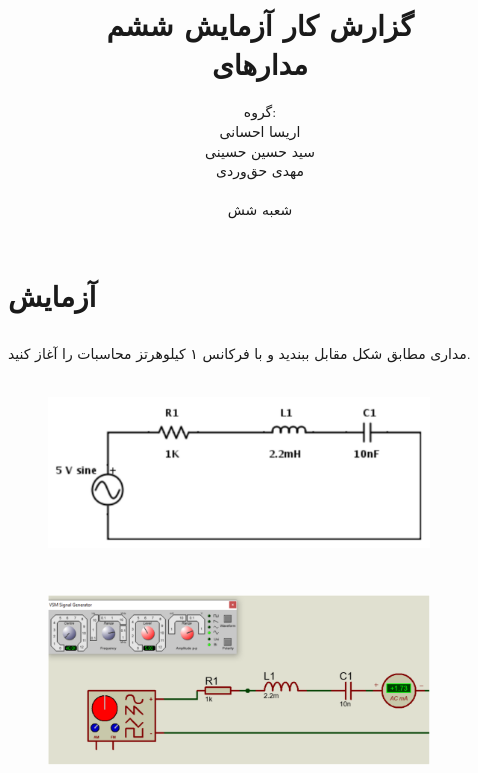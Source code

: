 \documentclass[12pt]{article}
\title{	گزارش کار آزمایش ششم \\ مدار‌های \lr{RLC}
}
\author{	گروه: \\	اریسا احسانی \\	سید حسین حسینی \\	مهدی حق‌وردی \\ \\	شعبه شش
}
\date{}
\begin{document}
\maketitle
\tableofcontents
\clearpage

\section{آزمایش}

\subsection{}
مداری مطابق شکل مقابل ببندید و با فرکانس ۱ کیلوهرتز محاسبات را آغاز کنید.

\begin{figure}[H]
\begin{center}
\includegraphics[width=0.9\textwidth, height=5cm]{./images/6.1}
\end{center}
\end{figure}

\begin{figure}[H]
\begin{center}
\includegraphics[width=0.9\textwidth, height=5cm]{./images/6.1.a}
\end{center}
\end{figure}
\end{document}
